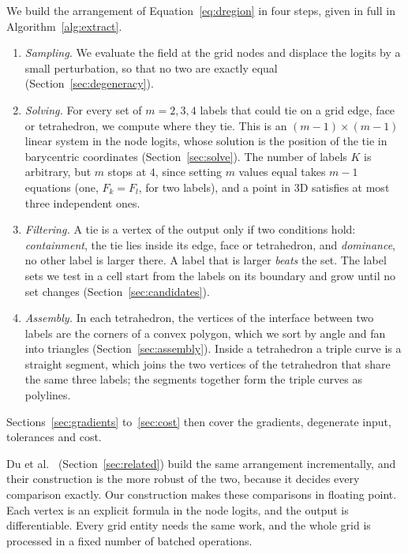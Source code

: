 \documentclass{egpubl}
\theoremstyle{definition}
\newcommand{\interp}{F}
\begin{document}
We build the arrangement of Equation~\eqref{eq:dregion} in four steps, given
in full in Algorithm~\ref{alg:extract}.
\begin{enumerate}
\item[(i)] \emph{Sampling.} We evaluate the field at the grid nodes and
displace the logits by a small perturbation, so that no two are
exactly equal (Section~\ref{sec:degeneracy}).
\item[(ii)] \emph{Solving.} For every set of $m = 2, 3, 4$ labels that could
tie on a grid edge, face or tetrahedron, we compute where they tie. This is an
$(m-1)\times(m-1)$ linear system in the node logits, whose solution is the
position of the tie in barycentric coordinates (Section~\ref{sec:solve}). The
number of labels $K$ is arbitrary, but $m$ stops at $4$, since setting $m$ values
equal takes $m-1$ equations (one, $\interp_k = \interp_l$, for two labels), and
a point in 3D satisfies at most three independent ones.
\item[(iii)] \emph{Filtering.} A tie is a vertex of the output only if two
conditions hold: \emph{containment}, the tie lies inside its edge, face or
tetrahedron, and \emph{dominance}, no other label is larger there. A label
that is larger \emph{beats} the set. The label sets we test in a cell start from the labels
on its boundary and grow until no set changes (Section~\ref{sec:candidates}).
\item[(iv)] \emph{Assembly.} In each tetrahedron, the vertices of the
interface between two labels are the corners of a convex polygon, which we
sort by angle and fan into triangles (Section~\ref{sec:assembly}). Inside a
tetrahedron a triple curve is a straight segment, which joins the two
vertices of the tetrahedron that share the same three labels; the segments
together form the triple curves as polylines.
\end{enumerate}
Sections~\ref{sec:gradients} to~\ref{sec:cost} then cover the gradients,
degenerate input, tolerances and cost.

Du et al.~\cite{du2022} (Section~\ref{sec:related}) build the same arrangement
incrementally, and their construction is the more robust of the two, because
it decides every comparison exactly. Our construction makes these comparisons
in floating point. Each vertex is an explicit formula in the node logits, and
the output is differentiable. Every grid entity needs the same work, and the
whole grid is processed in a fixed number of batched operations.
\end{document}
